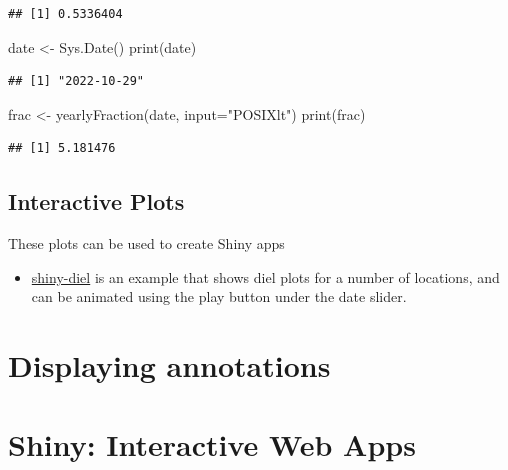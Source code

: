 \documentclass[
]{book}
\newenvironment{Shaded}{\begin{snugshade}}{\end{snugshade}}
\newcommand{\AttributeTok}[1]{\textcolor[rgb]{0.77,0.63,0.00}{#1}}
\newcommand{\FunctionTok}[1]{\textcolor[rgb]{0.00,0.00,0.00}{#1}}
\newcommand{\NormalTok}[1]{#1}
\newcommand{\OtherTok}[1]{\textcolor[rgb]{0.56,0.35,0.01}{#1}}
\newcommand{\StringTok}[1]{\textcolor[rgb]{0.31,0.60,0.02}{#1}}
\providecommand{\tightlist}{%
  \setlength{\itemsep}{0pt}\setlength{\parskip}{0pt}}
\begin{document}
\begin{verbatim}
## [1] 0.5336404
\end{verbatim}

\begin{Shaded}
\begin{Highlighting}[]
\NormalTok{date }\OtherTok{\textless{}{-}} \FunctionTok{Sys.Date}\NormalTok{()}
\FunctionTok{print}\NormalTok{(date)}
\end{Highlighting}
\end{Shaded}

\begin{verbatim}
## [1] "2022-10-29"
\end{verbatim}

\begin{Shaded}
\begin{Highlighting}[]
\NormalTok{frac }\OtherTok{\textless{}{-}} \FunctionTok{yearlyFraction}\NormalTok{(date, }\AttributeTok{input=}\StringTok{"POSIXlt"}\NormalTok{)}
\FunctionTok{print}\NormalTok{(frac)}
\end{Highlighting}
\end{Shaded}

\begin{verbatim}
## [1] 5.181476
\end{verbatim}

\hypertarget{interactive-plots}{%
\section{Interactive Plots}\label{interactive-plots}}

These plots can be used to create Shiny apps

\begin{itemize}
\tightlist
\item
  \href{https://shiny.ebaker.me.uk/shiny-diel/}{shiny-diel} is an example that shows diel plots for a number of locations, and can be animated using the play button under the date slider.
\end{itemize}

\hypertarget{displaying-annotations}{%
\chapter{Displaying annotations}\label{displaying-annotations}}

\hypertarget{shiny-interactive-web-apps}{%
\chapter{Shiny: Interactive Web Apps}\label{shiny-interactive-web-apps}}
\end{document}
